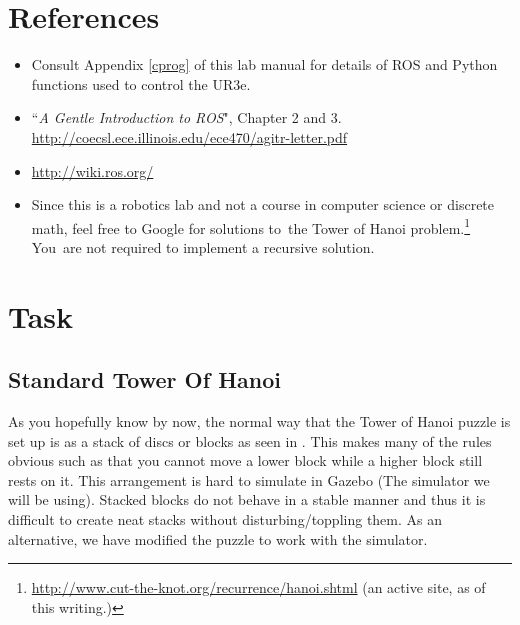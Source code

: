 \section{References}
\begin{itemize}
\item Consult Appendix \ref{cprog} of this lab manual for details of ROS and Python functions used to control the UR3e.
\item ``\textit{A Gentle Introduction to ROS}", Chapter 2 and 3. \url{http://coecsl.ece.illinois.edu/ece470/agitr-letter.pdf}
\item \url{http://wiki.ros.org/}
\item Since this is a robotics lab and not a course in computer science or discrete math, feel free to Google for solutions to\
the Tower of Hanoi problem.\footnote{\url{http://www.cut-the-knot.org/recurrence/hanoi.shtml} (an active site, as of this writing.)} You\
are not required to implement a recursive solution.

\end{itemize}

\newpage
\section{Task}
\subsection{Standard Tower Of Hanoi}
As you hopefully know by now, the normal way that the Tower of Hanoi puzzle is set up is as a stack of discs or blocks as seen in .  This makes many of the rules obvious such as that you cannot move a lower block while a higher block still rests on it.  This arrangement is hard to simulate in Gazebo (The simulator we will be using).  Stacked blocks do not behave in a stable manner and thus it is difficult to create neat stacks without disturbing/toppling them.  As an alternative, we have modified the puzzle to work with the simulator.

